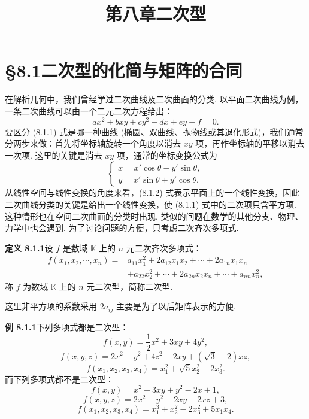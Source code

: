 \documentclass[UTF8,12pt,a4paper,fontset=fandol]{ctexart}
\title{第八章\quad 二次型}
\author{}
\date{}
\begin{document}
\maketitle

\section*{§8.1\quad 二次型的化简与矩阵的合同}

在解析几何中，我们曾经学过二次曲线及二次曲面的分类. 以平面二次曲线为例，一条二次曲线可以由一个二元二次方程给出：
\begin{equation}
ax^2+bxy+cy^2+dx+ey+f=0.
\tag{8.1.1}
\end{equation}
要区分 (8.1.1) 式是哪一种曲线 (椭圆、双曲线、抛物线或其退化形式)，我们通常分两步来做：首先将坐标轴旋转一个角度以消去 $xy$ 项，再作坐标轴的平移以消去一次项. 这里的关键是消去 $xy$ 项，通常的坐标变换公式为
\begin{equation}
\left\{\begin{array}{l}
x=x'\cos\theta-y'\sin\theta,\\
y=x'\sin\theta+y'\cos\theta.
\end{array}\right.
\tag{8.1.2}
\end{equation}
从线性空间与线性变换的角度来看，(8.1.2) 式表示平面上的一个线性变换，因此二次曲线分类的关键是给出一个线性变换，使 (8.1.1) 式中的二次项只含平方项. 这种情形也在空间二次曲面的分类时出现. 类似的问题在数学的其他分支、物理、力学中也会遇到. 为了讨论问题的方便，只考虑二次齐次多项式.

\noindent\textbf{定义 8.1.1}\quad 设 $f$ 是数域 $\mathbb K$ 上的 $n$ 元二次齐次多项式：
\begin{equation}
\begin{aligned}
f(x_1,x_2,\cdots,x_n)
={}&a_{11}x_1^2+2a_{12}x_1x_2+\cdots+2a_{1n}x_1x_n\\
&+a_{22}x_2^2+\cdots+2a_{2n}x_2x_n+\cdots+a_{nn}x_n^2,
\end{aligned}
\tag{8.1.3}
\end{equation}
称 $f$ 为数域 $\mathbb K$ 上的 $n$ 元二次型，简称二次型.

这里非平方项的系数采用 $2a_{ij}$ 主要是为了以后矩阵表示的方便.

\noindent\textbf{例 8.1.1}\quad 下列多项式都是二次型：
\[
f(x,y)=\frac12x^2+3xy+4y^2,
\]
\[
f(x,y,z)=2x^2-y^2+4z^2-2xy+(\sqrt3+2)xz,
\]
\[
f(x_1,x_2,x_3,x_4)=x_1^2+\sqrt5x_2^2-2x_3^2.
\]
而下列多项式都不是二次型：
\[
f(x,y)=x^2+3xy+y^2-2x+1,
\]
\[
f(x,y,z)=2x^2-y^2-2xy+2xz+3,
\]
\[
f(x_1,x_2,x_3,x_4)=x_1^3+x_2^2-2x_3^2+5x_1x_4.
\]
\end{document}
